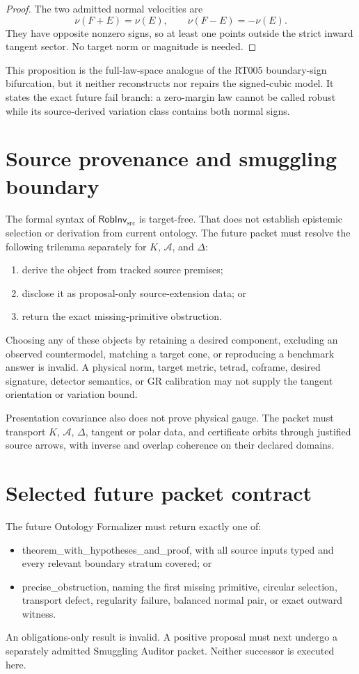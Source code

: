 \documentclass[11pt]{article}
\newcommand{\RobInv}{\mathsf{RobInv}_{\mathrm{src}}}
\newcommand{\status}[1]{\textsf{#1}}
\begin{document}
\begin{proof}
The two admitted normal velocities are
\[
 \nu(F+E)=\nu(E),\qquad
 \nu(F-E)=-\nu(E).
\]
They have opposite nonzero signs, so at least one points outside the strict
inward tangent sector.  No target norm or magnitude is needed.
\end{proof}

This proposition is the full-law-space analogue of the RT005 boundary-sign
bifurcation, but it neither reconstructs nor repairs the signed-cubic model.
It states the exact future fail branch: a zero-margin law cannot be called
robust while its source-derived variation class contains both normal signs.

\section{Source provenance and smuggling boundary}

The formal syntax of \(\RobInv\) is target-free.  That does not establish
epistemic selection or derivation from current ontology.  The future packet
must resolve the following trilemma separately for \(K\), \(\mathcal A\),
and \(\Delta\):
\begin{enumerate}
  \item derive the object from tracked source premises;
  \item disclose it as proposal-only source-extension data; or
  \item return the exact missing-primitive obstruction.
\end{enumerate}
Choosing any of these objects by retaining a desired component, excluding an
observed countermodel, matching a target cone, or reproducing a benchmark
answer is invalid.  A physical norm, target metric, tetrad, coframe, desired
signature, detector semantics, or GR calibration may not supply the tangent
orientation or variation bound.

Presentation covariance also does not prove physical gauge.  The packet must
transport \(K\), \(\mathcal A\), \(\Delta\), tangent or polar data, and
certificate orbits through justified source arrows, with inverse and overlap
coherence on their declared domains.

\section{Selected future packet contract}

The future Ontology Formalizer must return exactly one of:
\begin{itemize}
  \item \status{theorem\_with\_hypotheses\_and\_proof}, with all source
  inputs typed and every relevant boundary stratum covered; or
  \item \status{precise\_obstruction}, naming the first missing primitive,
  circular selection, transport defect, regularity failure, balanced normal
  pair, or exact outward witness.
\end{itemize}
An obligations-only result is invalid.  A positive proposal must next undergo
a separately admitted Smuggling Auditor packet.  Neither successor is
executed here.
\end{document}
